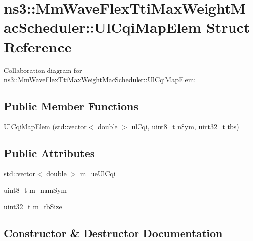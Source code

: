 \hypertarget{structns3_1_1MmWaveFlexTtiMaxWeightMacScheduler_1_1UlCqiMapElem}{}\section{ns3\+:\+:Mm\+Wave\+Flex\+Tti\+Max\+Weight\+Mac\+Scheduler\+:\+:Ul\+Cqi\+Map\+Elem Struct Reference}
\label{structns3_1_1MmWaveFlexTtiMaxWeightMacScheduler_1_1UlCqiMapElem}


Collaboration diagram for ns3\+:\+:Mm\+Wave\+Flex\+Tti\+Max\+Weight\+Mac\+Scheduler\+:\+:Ul\+Cqi\+Map\+Elem\+:
\subsection*{Public Member Functions}
\begin{DoxyCompactItemize}
\item 
\hyperlink{structns3_1_1MmWaveFlexTtiMaxWeightMacScheduler_1_1UlCqiMapElem_a425ac4b0b9f9c80a2f7174f80214da20}{Ul\+Cqi\+Map\+Elem} (std\+::vector$<$ double $>$ ul\+Cqi, uint8\+\_\+t n\+Sym, uint32\+\_\+t tbs)
\end{DoxyCompactItemize}
\subsection*{Public Attributes}
\begin{DoxyCompactItemize}
\item 
std\+::vector$<$ double $>$ \hyperlink{structns3_1_1MmWaveFlexTtiMaxWeightMacScheduler_1_1UlCqiMapElem_ab58a19edd95d0c68a3fba979a21c6c83}{m\+\_\+ue\+Ul\+Cqi}
\item 
uint8\+\_\+t \hyperlink{structns3_1_1MmWaveFlexTtiMaxWeightMacScheduler_1_1UlCqiMapElem_ade92870b313c644f2c45b0878f3f5702}{m\+\_\+num\+Sym}
\item 
uint32\+\_\+t \hyperlink{structns3_1_1MmWaveFlexTtiMaxWeightMacScheduler_1_1UlCqiMapElem_a7ed023f010906081a2dd11c5301c5f40}{m\+\_\+tb\+Size}
\end{DoxyCompactItemize}


\subsection{Constructor \& Destructor Documentation}
